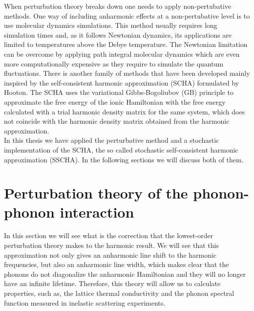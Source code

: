 When perturbation theory breaks down one needs to apply non-pertubative methods. One way of including anharmonic effects at a non-pertubative level is to use molecular dynamics 
simulations\cite{hellman2013temperature,hellman2013temperature1,hellman2011lattice,ljungberg2013temperature,magduau2013identification,wang1990tight,zhang2014phonon,de2009thermal}. This method usually requires long simulation
times and, as it follows Newtonian dynamics, its applications are limited to temperatures above the Debye temperature. The Newtonian limitation can be overcome by applying path integral molecular 
dynamics\cite{ceperley1995path} which are even more computationally expensive as they require to simulate the quantum fluctuations. There is another family of 
methods\cite{errea2014anharmonic,errea2013first,errea2011anharmonic,monserrat2013anharmonic,tadano2015self,georgescu2012self,brown2013self,patrick2015anharmonic,} that have been developed mainly inspired by the 
self-consistent harmonic approximation (SCHA) formulated by Hooton\cite{hooton1955li}. The SCHA uses the variational Gibbs-Bogoliubov (GB) principle to approximate the free energy of the ionic Hamiltonian with 
the free energy calculated with a trial harmonic density matrix for the same system, which does not coincide with the harmonic density matrix obtained from the harmonic approximation. \\

In this thesis we have applied the perturbative method\cite{paulatto2013anharmonic} and a stochastic implementation of the SCHA, the so called stochastic self-consistent 
harmonic approximation (SSCHA)\cite{errea2013first,errea2014anharmonic,bianco2017second,monacelli2018pressure}. In 
the following sections we will discuss both of them.

\section{Perturbation theory of the phonon-phonon interaction}
\label{perturbation-theory-third}

In this section we will see what is the correction that the lowest-order perturbation theory makes to the harmonic 
result. We will see that this approximation not only gives an anharmonic line shift to the harmonic 
frequencies, but also an anharmonic line width, which makes clear that the phonons do not diagonalize the anharmonic Hamiltonian and they will no longer have an infinite lifetime. Therefore, this 
theory will allow us to calculate properties, such as, the lattice thermal conductivity and the phonon spectral function measured in inelastic scattering experiments. \\

